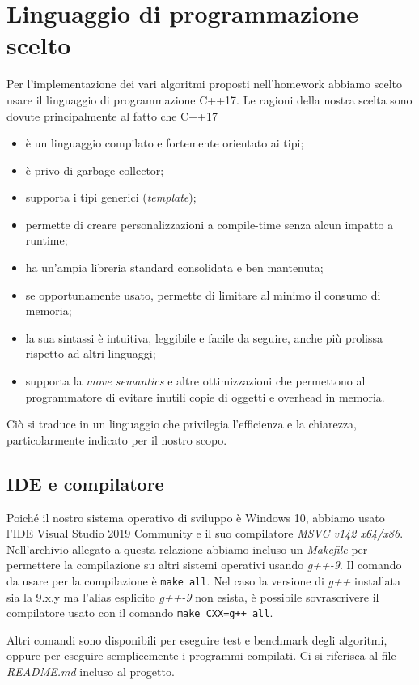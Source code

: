 \section{Linguaggio di programmazione scelto}
\label{cap:language-choice}

Per l'implementazione dei vari algoritmi proposti nell'homework abbiamo scelto usare il linguaggio di programmazione
C++17. Le ragioni della nostra scelta sono dovute principalmente al fatto che C++17

\begin{itemize}
    \item è un linguaggio compilato e fortemente orientato ai tipi;
    \item è privo di garbage collector;
    \item supporta i tipi generici (\textit{template});
    \item permette di creare personalizzazioni a compile-time senza alcun impatto a runtime;
    \item ha un'ampia libreria standard consolidata e ben mantenuta;
    \item se opportunamente usato, permette di limitare al minimo il consumo di memoria;
    \item la sua sintassi è intuitiva, leggibile e facile da seguire, anche più prolissa rispetto ad altri linguaggi;
    \item supporta la \textit{move semantics} e altre ottimizzazioni che permettono al programmatore di evitare inutili copie di oggetti e overhead in memoria.
\end{itemize}
Ciò si traduce in un linguaggio che privilegia l'efficienza e la chiarezza, particolarmente indicato per il nostro scopo.

\subsection{IDE e compilatore}

Poiché il nostro sistema operativo di sviluppo è Windows 10, abbiamo usato l'IDE Visual Studio 2019 Community e il suo compilatore \textit{MSVC v142 x64/x86}. \\

\noindent Nell'archivio allegato a questa relazione abbiamo incluso un \textit{Makefile} per permettere la compilazione su altri sistemi operativi usando \textit{g++-9}. Il comando da usare per la compilazione è \texttt{make all}. Nel caso la versione di \textit{g++} installata sia la 9.x.y ma l'alias esplicito \textit{g++-9} non esista, è possibile sovrascrivere il compilatore usato con il comando \texttt{make CXX=g++ all}.

Altri comandi sono disponibili per eseguire test e benchmark degli algoritmi, oppure per eseguire semplicemente i programmi compilati. Ci si riferisca al file \textit{README.md} incluso al progetto.
